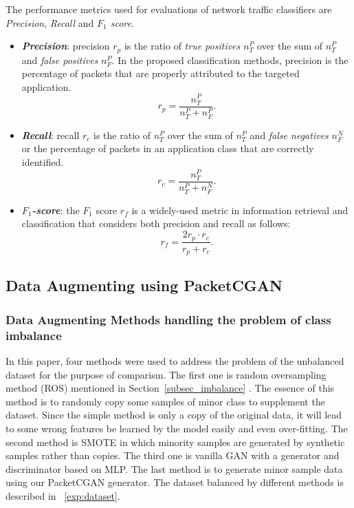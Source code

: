 \documentclass[conference]{IEEEtran}
\begin{document}
The performance metrics used for evaluations of network traffic classifiers are \emph{Precision}, \emph{Recall} and \emph{$F_1$ score}.
\begin{itemize}
	
	\item \textbf{\emph{Precision}}: precision $r_{p}$ is the ratio of \emph{true positives} $n_T^P$ over the sum of $n_T^P$ and \emph{false positives} $n_F^P$. In the proposed classification methods, precision is the percentage of packets that are properly attributed to the targeted application.
	\begin{equation}
	r_p = \frac{n_T^P}{n_T^P+n_F^P}.
	\end{equation}
	
	\item \textbf{\emph{Recall}}: recall $r_c$ is the ratio of $n_T^P$ over the sum of $n_T^P$ and \emph{false negatives} $n_F^N$ or the percentage of packets in an application class that are correctly identified.
	\begin{equation}
	r_c = \frac{n_T^P}{n_T^P+n_F^N}.
	\end{equation}
	
	\item \textbf{\emph{$F_1$-score}}: the $F_1$ score $r_f$ is a widely-used metric in information retrieval and classification that considers both precision and recall as follows:
	\begin{equation}
	r_f = \frac{2 r_p \cdot r_c}{r_p + r_c}.
	\end{equation}
	
\end{itemize}


\subsection {Data Augmenting using PacketCGAN}
\subsubsection {Data Augmenting Methods handling the problem of class imbalance}
In this paper, four methods were used to address the problem of the unbalanced dataset for the purpose of comparism. The first one is random oversampling method (ROS) mentioned in Section~\ref{subsec_imbalance} . The essence of this method is to randomly copy some samples of minor class to supplement the dataset. Since the simple method is only a copy of the original data, it will lead to some wrong features be learned by the model easily and even over-fitting. The second method is SMOTE in which minority samples are generated by synthetic samples rather than copies. The third one is vanilla GAN with a generator and discriminator based on MLP. The last method is to generate minor sample data using our PacketCGAN generator. The dataset balanced by different methods is described in ~\ref{exp:dataset}.
\end{document}
